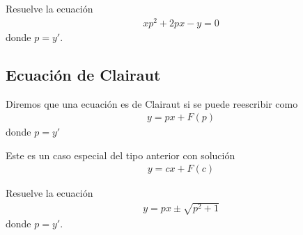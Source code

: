 {}
  \begin{problema}
   Resuelve la ecuación 
   \begin{align}
    xp^{2}+2px-y =0
    \end{align}
    donde $p=y'$.
  \end{problema}


\subsection{Ecuación de Clairaut}
{}
  Diremos que una ecuación es de Clairaut si se puede reescribir como 
  \begin{align}
   y = px+F(p)
   \end{align}
   donde $p = y'$

{}
  Este es un caso especial del tipo anterior con solución 
  \begin{align}
   y = cx + F(c)
   \end{align}

{}
  \begin{problema}
   Resuelve la ecuación
   \begin{align}
    y = px\pm \sqrt{p^{2}+1}
    \end{align}
    donde $p=y'$.
  \end{problema}


% 
% 
% 
%   
% 
